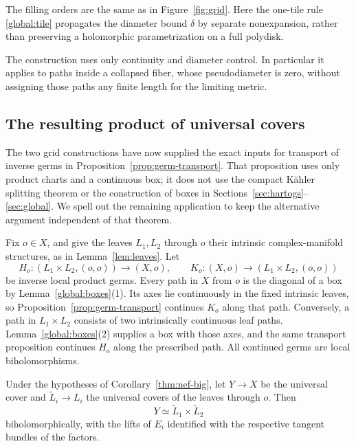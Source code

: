 The filling orders are the same as in Figure~\ref{fig:grid}. Here the
one-tile rule \eqref{global:tile} propagates the diameter bound
\(\delta\) by separate nonexpansion, rather than preserving a
holomorphic parametrization on a full polydisk.

The construction uses only continuity and diameter control.  In
particular it applies to paths inside a collapsed fiber, whose
pseudodiameter is zero, without assigning those paths any finite length
for the limiting metric.

\subsection{The resulting product of universal covers}

The two grid constructions have now supplied the exact inputs for
transport of inverse germs in Proposition~\ref{prop:germ-transport}.
That proposition uses only product charts and a continuous box; it does
not use the compact K\"ahler splitting theorem or the construction of
boxes in Sections~\ref{sec:hartogs}--\ref{sec:global}. We spell out the
remaining application to keep the alternative argument independent of
that theorem.

Fix \(o\in X\), and give the leaves \(L_1,L_2\) through \(o\)
their intrinsic complex-manifold structures, as in
Lemma~\ref{lem:leaves}. Let
\[
 H_o:(L_1\times L_2,(o,o))\longrightarrow(X,o),\qquad
 K_o:(X,o)\longrightarrow(L_1\times L_2,(o,o))
\]
be inverse local product germs. Every path in \(X\) from \(o\) is
the diagonal of a box by Lemma~\ref{global:boxes}(1). Its axes lie
continuously in the fixed intrinsic leaves, so
Proposition~\ref{prop:germ-transport} continues \(K_o\) along that
path. Conversely, a path in \(L_1\times L_2\) consists of two
intrinsically continuous leaf paths. Lemma~\ref{global:boxes}(2) supplies
a box with those axes, and the same transport proposition continues
\(H_o\) along the prescribed path. All continued germs are local
biholomorphisms.

\begin{proposition}\label{global:product}
Under the hypotheses of Corollary~\ref{thm:nef-big}, let \(Y\to X\)
be the universal cover and \(\widetilde L_i\to L_i\) the universal
covers of the leaves through \(o\). Then
\[
 Y\simeq\widetilde L_1\times\widetilde L_2
\]
biholomorphically, with the lifts of \(E_i\) identified with the
respective tangent bundles of the factors.
\end{proposition}

